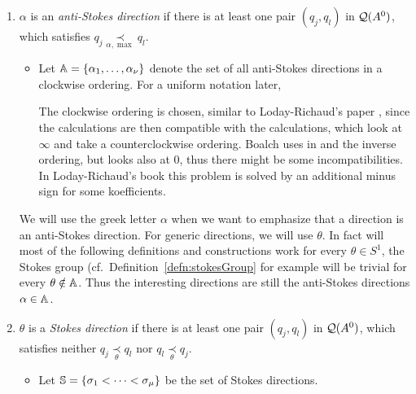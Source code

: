 \begin{defn}\label{defn:antiStokesDir}
  \begin{enumerate}
    \item $\alpha$ is an \emph{anti-Stokes direction} if there is at least one
      pair $(q_j,q_l)$ in $\cQ(A^0)$, which satisfies
      $q_j \underset{\alpha,\max}{\prec} q_l$.
      \begin{itemize}
        \item Let $\A=\{\alpha_1,\dots,\alpha_{\nu}\}$ denote the set of all
          anti-Stokes directions in a clockwise ordering. For a uniform
          notation later, 
          \begin{s-rem}
            The clockwise ordering is chosen, similar to Loday-Richaud's paper
            \cite{Loday1994}, since the calculations are then compatible with
            the calculations, which look at $\infty$ and take a
            counterclockwise ordering.
            Boalch uses in \cite{boalch} and \cite{thboalch} the inverse
            ordering, but looks also at $0$, thus there might be some
            incompatibilities.
            In Loday-Richaud's book \cite{Loday2014} this problem is solved by
            an additional minus sign for some koefficients.
          \end{s-rem}
      \end{itemize}
      \begin{s-rem}
        We will use the greek letter $\alpha$ when we want to emphasize that
        a direction is an anti-Stokes direction. For generic directions, we
        will use $\theta$. In fact will most of the following definitions and
        constructions work for every $\theta\in S^1$, the Stokes group
        (cf.\ Definition~\ref{defn:stokesGroup} for example will be trivial
        for every $\theta\notin\A$. Thus the interesting directions are still
        the anti-Stokes directions $\alpha\in\A$.
      \end{s-rem}
    \item $\theta$ is a \emph{Stokes direction} if there is at least one pair
      $(q_j,q_l)$ in $\cQ(A^0)$, which satisfies neither
      $q_j\underset{\theta}{\prec} q_l$ nor $q_l\underset{\theta}{\prec} q_j$.
      \begin{itemize}
        \item Let $\S=\{\sigma_1<\cdots<\sigma_\mu\}$ be the set of Stokes
          directions.
      \end{itemize}
  \end{enumerate}
\end{defn}

